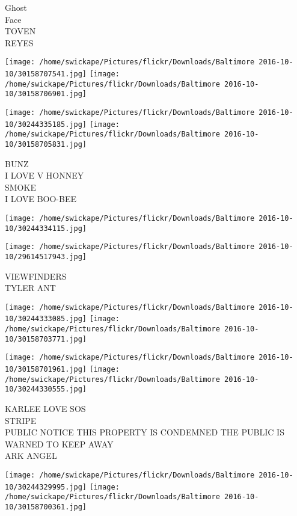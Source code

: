 \documentclass[10pt,letterpaper]{article}
\begin{document}
Ghost\\
Face\\
TOVEN\\
REYES\\
\pagebreak

\texttt{[image: /home/swickape/Pictures/flickr/Downloads/Baltimore 2016-10-10/30158707541.jpg]}
\texttt{[image: /home/swickape/Pictures/flickr/Downloads/Baltimore 2016-10-10/30158706901.jpg]}

\texttt{[image: /home/swickape/Pictures/flickr/Downloads/Baltimore 2016-10-10/30244335185.jpg]}
\texttt{[image: /home/swickape/Pictures/flickr/Downloads/Baltimore 2016-10-10/30158705831.jpg]}

BUNZ\\
I LOVE V HONNEY\\
SMOKE\\
I LOVE BOO{-}BEE\\
\pagebreak

\texttt{[image: /home/swickape/Pictures/flickr/Downloads/Baltimore 2016-10-10/30244334115.jpg]}

\vspace{0.25in}
\texttt{[image: /home/swickape/Pictures/flickr/Downloads/Baltimore 2016-10-10/29614517943.jpg]}

VIEWFINDERS\\
TYLER ANT\\
\pagebreak

\texttt{[image: /home/swickape/Pictures/flickr/Downloads/Baltimore 2016-10-10/30244333085.jpg]}
\texttt{[image: /home/swickape/Pictures/flickr/Downloads/Baltimore 2016-10-10/30158703771.jpg]}

\texttt{[image: /home/swickape/Pictures/flickr/Downloads/Baltimore 2016-10-10/30158701961.jpg]}
\texttt{[image: /home/swickape/Pictures/flickr/Downloads/Baltimore 2016-10-10/30244330555.jpg]}

KARLEE LOVE SOS\\
STRIPE\\
PUBLIC NOTICE THIS PROPERTY IS CONDEMNED THE PUBLIC IS WARNED TO KEEP AWAY\\
ARK ANGEL\\
\pagebreak

\texttt{[image: /home/swickape/Pictures/flickr/Downloads/Baltimore 2016-10-10/30244329995.jpg]}
\texttt{[image: /home/swickape/Pictures/flickr/Downloads/Baltimore 2016-10-10/30158700361.jpg]}
\end{document}
